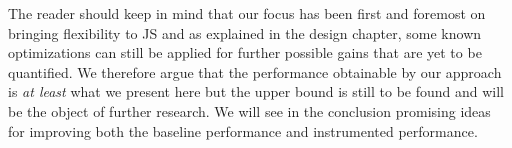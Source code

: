 The reader should keep in mind that our focus has been first and foremost on
bringing flexibility to JS and as explained in the design chapter, some known
optimizations can still be applied for further possible gains that are yet to
be quantified. We therefore argue that the performance obtainable by our
approach is \textit{at least} what we present here but the upper bound is still
to be found and will be the object of further research. We will see in the
conclusion promising ideas for improving both the baseline performance and
instrumented performance.

